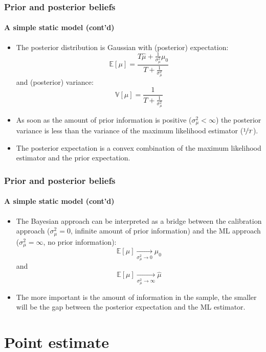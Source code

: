 \documentclass[10pt,slidestop]{beamer}
\begin{document}
\begin{frame}
  \frametitle{Prior and posterior beliefs}
  \framesubtitle{A simple static model (cont'd)}

  \begin{itemize}
  \item The posterior distribution is Gaussian with (posterior) expectation:
    \[
    \mathbb E \left[\mu\right] =
    \frac{T\widehat{\mu}+\frac{1}{\sigma_{\mu}^2}\mu_0}
    {T+\frac{1}{\sigma_{\mu}^2}}
    \]
    and (posterior) variance:
    \[
    \mathbb V \left[\mu\right] = \frac{1}
{T+\frac{1}{\sigma_{\mu}^2}}
    \]
  \item As soon as the amount of prior information is positive
    ($\sigma_{\mu}^2<\infty$) the posterior variance is less than the
    variance of the maximum likelihood estimator ($\nicefrac{1}{T}$).

\bigskip

  \item The posterior expectation is a convex combination of the
    maximum likelihood estimator and the prior expectation.
  \end{itemize}
\end{frame}


\begin{frame}
  \frametitle{Prior and posterior beliefs}
  \framesubtitle{A simple static model (cont'd)}

  \begin{itemize}
  \item The Bayesian approach can be interpreted as a bridge between
    the calibration approach ($\sigma_{\mu}^2=0$, infinite amount of
    prior information) and the ML approach
    ($\sigma_{\mu}^2=\infty$, no prior information):
    \[
    \mathbb E \left[\mu\right] \xrightarrow[\sigma_{\mu}^2\rightarrow 0]{}\mu_0
    \]
    and
    \[
    \mathbb E \left[\mu\right] \xrightarrow[\sigma_{\mu}^2\rightarrow \infty]{}\widehat{\mu}
    \]

    \bigskip

  \item The more important is the amount of information in the sample,
    the smaller will be the gap between the posterior expectation and
    the ML estimator.
  \end{itemize}
\end{frame}

\section{Point estimate}
\end{document}
